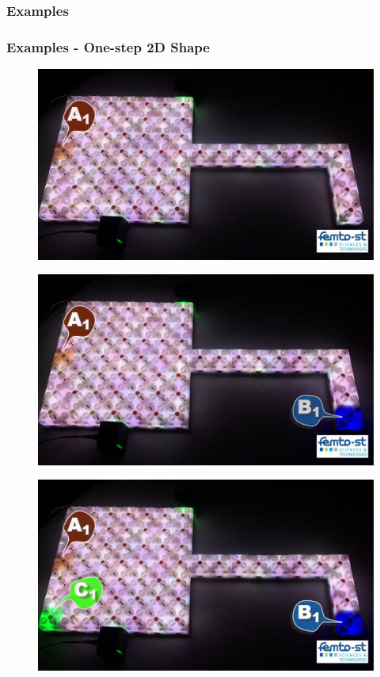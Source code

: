 \subsubsection{Examples}

\begin{frame} \frametitle{Examples - One-step 2D Shape}

 {
	\begin{figure}
		\centering
		\includegraphics[width=0.7\linewidth]{fig/centrality/abc-center-example-2/1}
	\end{figure}
}

 {
	\begin{figure}
		\centering
		\includegraphics[width=0.7\linewidth]{fig/centrality/abc-center-example-2/2}
	\end{figure}
}

 {
	\begin{figure}
		\centering
		\includegraphics[width=0.7\linewidth]{fig/centrality/abc-center-example-2/3}
	\end{figure}
}


\end{frame}
